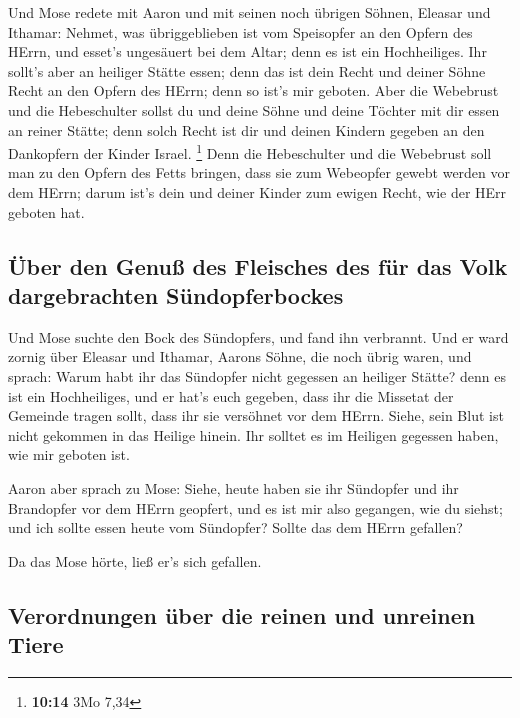  Und Mose redete mit Aaron und mit seinen noch übrigen
Söhnen, Eleasar und Ithamar: Nehmet, was übriggeblieben ist vom
Speisopfer an den Opfern des HErrn, und esset's ungesäuert bei dem
Altar; denn es ist ein Hochheiliges.  Ihr sollt's aber an
heiliger Stätte essen; denn das ist dein Recht und deiner Söhne Recht an
den Opfern des HErrn; denn so ist's mir geboten.  Aber
die Webebrust und die Hebeschulter sollst du und deine Söhne und deine
Töchter mit dir essen an reiner Stätte; denn solch Recht ist dir und
deinen Kindern gegeben an den Dankopfern der Kinder Israel. \footnote{\textbf{10:14}
  3Mo 7,34}  Denn die Hebeschulter und die Webebrust soll
man zu den Opfern des Fetts bringen, dass sie zum Webeopfer gewebt
werden vor dem HErrn; darum ist's dein und deiner Kinder zum ewigen
Recht, wie der HErr geboten hat.

\hypertarget{uxfcber-den-genuuxdf-des-fleisches-des-fuxfcr-das-volk-dargebrachten-suxfcndopferbockes}{%
\subsection{Über den Genuß des Fleisches des für das Volk dargebrachten
Sündopferbockes}\label{uxfcber-den-genuuxdf-des-fleisches-des-fuxfcr-das-volk-dargebrachten-suxfcndopferbockes}}

 Und Mose suchte den Bock des Sündopfers, und fand ihn
verbrannt. Und er ward zornig über Eleasar und Ithamar, Aarons Söhne,
die noch übrig waren, und sprach:  Warum habt ihr das
Sündopfer nicht gegessen an heiliger Stätte? denn es ist ein
Hochheiliges, und er hat's euch gegeben, dass ihr die Missetat der
Gemeinde tragen sollt, dass ihr sie versöhnet vor dem HErrn.
 Siehe, sein Blut ist nicht gekommen in das Heilige
hinein. Ihr solltet es im Heiligen gegessen haben, wie mir geboten ist.

 Aaron aber sprach zu Mose: Siehe, heute haben sie ihr
Sündopfer und ihr Brandopfer vor dem HErrn geopfert, und es ist mir also
gegangen, wie du siehst; und ich sollte essen heute vom Sündopfer?
Sollte das dem HErrn gefallen?

 Da das Mose hörte, ließ er's sich gefallen.

\hypertarget{verordnungen-uxfcber-die-reinen-und-unreinen-tiere}{%
\subsection{Verordnungen über die reinen und unreinen
Tiere}\label{verordnungen-uxfcber-die-reinen-und-unreinen-tiere}}

